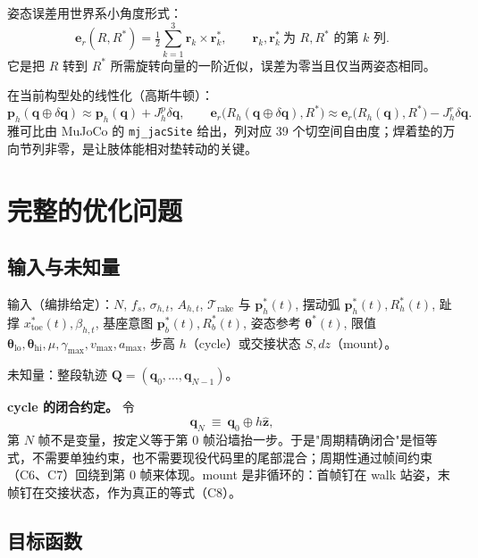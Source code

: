 \documentclass[11pt]{article}
\newcommand{\code}[1]{\texttt{\small #1}}
\newcommand{\dq}{\delta\bm q}
\newcommand{\zhat}{\hat{\bm z}}
\begin{document}
姿态误差用世界系小角度形式：
\begin{equation}
\bm e_r(R,R^*)=\tfrac12\sum_{k=1}^{3}\bm r_k\times\bm r^*_k,\qquad \bm r_k,\bm r^*_k\ \text{为 }R,R^*\text{ 的第 }k\text{ 列}.
\end{equation}
它是把 $R$ 转到 $R^*$ 所需旋转向量的一阶近似，误差为零当且仅当两姿态相同。

在当前构型处的线性化（高斯牛顿）：
\begin{equation}
\bm p_h(\bm q\oplus\dq)\approx\bm p_h(\bm q)+J^p_h\dq,\qquad
\bm e_r\bigl(R_h(\bm q\oplus\dq),R^*\bigr)\approx\bm e_r\bigl(R_h(\bm q),R^*\bigr)-J^r_h\dq .
\label{eq:lin}
\end{equation}
雅可比由 MuJoCo 的 \code{mj\_jacSite} 给出，列对应 39 个切空间自由度；焊着垫的万向节列非零，是让肢体能相对垫转动的关键。

\section{完整的优化问题}

\subsection{输入与未知量}

输入（编排给定）：$N$, $f_s$, $\sigma_{h,t}$, $A_{h,t}$, $\mathcal T_{\mathrm{rake}}$ 与 $\bm p^*_h(t)$, 摆动弧 $\bm p^*_h(t),R^*_h(t)$, 趾撑 $x^*_{\mathrm{toe}}(t),\beta_{h,t}$, 基座意图 $\bm p^*_b(t),R^*_b(t)$, 姿态参考 $\bm\theta^*(t)$, 限值 $\bm\theta_{\mathrm{lo}},\bm\theta_{\mathrm{hi}},\mu,\gamma_{\max},v_{\max},a_{\max}$, 步高 $h$（cycle）或交接状态 $S,dz$（mount）。

未知量：整段轨迹 $\bm Q=(\bm q_0,\dots,\bm q_{N-1})$。

\textbf{cycle 的闭合约定。} 令
\begin{equation}
\bm q_N\ \equiv\ \bm q_0\oplus h\zhat ,
\label{eq:closure}
\end{equation}
第 $N$ 帧不是变量，按定义等于第 0 帧沿墙抬一步。于是"周期精确闭合"是恒等式，不需要单独约束，也不需要现役代码里的尾部混合；周期性通过帧间约束（C6、C7）回绕到第 0 帧来体现。mount 是非循环的：首帧钉在 walk 站姿，末帧钉在交接状态，作为真正的等式（C8）。

\subsection{目标函数}
\end{document}
